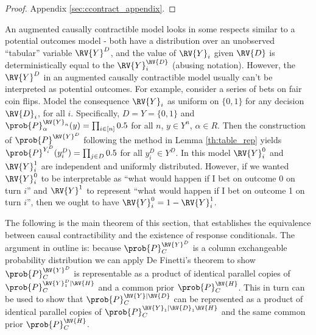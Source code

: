 \begin{proof}
Appendix \ref{sec:ccontract_appendix}.
\end{proof}

An augmented causally contractible model looks in some respects similar to a potential outcomes model - both have a distribution over an unobserved ``tabular'' variable $\RV{Y}^D$, and the value of $\RV{Y}_i$ given $\RV{D}$ is deterministically equal to the $\RV{Y}_i^\RV{D}$ (abusing notation). However, the $\RV{Y}^D$ in an augmented causally contractible model usually can't be interpreted as potential outcomes. For example, consider a series of bets on fair coin flips. Model the consequence $\RV{Y}_i$ as uniform on $\{0,1\}$ for any decision $\RV{D}_i$, for all $i$. Specifically, $D=Y=\{0,1\}$ and $\prob{P}_\alpha^{\RV{Y}_n}(y)=\prod_{i\in [n]} 0.5$ for all $n$, $y\in Y^n$, $\alpha\in R$. Then the construction of $\prob{P}^{\RV{Y}^D}$ following the method in Lemma \ref{th:table_rep} yields $\prob{P}^{Y^D_i}(y^D_i)=\prod_{j\in D} 0.5$ for all $y^D_i\in Y^D$. In this model $\RV{Y}^0_i$ and $\RV{Y}^1_i$ are independent and uniformly distributed. However, if we wanted $\RV{Y}^0_i$ to be interpretable as ``what would happen if I bet on outcome 0 on turn $i$'' and $\RV{Y}^1$ to represent ``what would happen if I bet on outcome 1 on turn $i$'', then we ought to have $\RV{Y}^0_i = 1-\RV{Y}^1_i$.

The following is the main theorem of this section, that establishes the equivalence between causal contractibility and the existence of response conditionals. The argument in outline is: because $\prob{P}_C^{\RV{Y}^D}$ is a column exchangeable probability distribution we can apply De Finetti's theorem to show $\prob{P}_C^{\RV{Y}^D}$ is representable as a product of identical parallel copies of $\prob{P}_C^{\RV{Y}_1^D|\RV{H}}$ and a common prior $\prob{P}_C^{\RV{H}}$. This in turn can be used to show that $\prob{P}_C^{\RV{Y}|\RV{D}}$ can be represented as a product of identical parallel copies of $\prob{P}_C^{\RV{Y}_1|\RV{D}_1\RV{H}}$ and the same common prior $\prob{P}_C^{\RV{H}}$.


